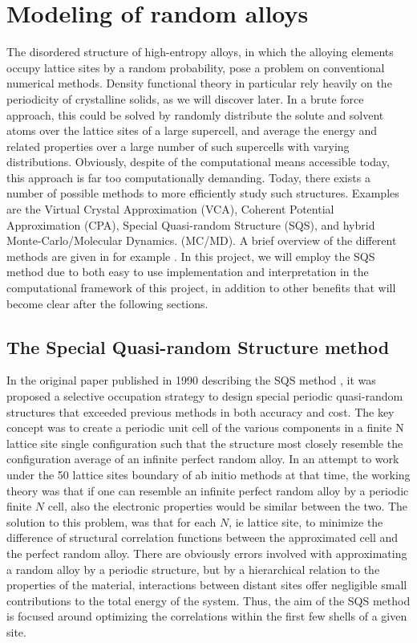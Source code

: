 \chapter{Modeling of random alloys}
\label{sec:SQS}

The disordered structure of high-entropy alloys, in which the alloying elements occupy lattice sites by a random probability, pose a problem on conventional numerical methods. Density functional theory in particular rely heavily on the periodicity of crystalline solids, as we will discover later. In a brute force approach, this could be solved by randomly distribute the solute and solvent atoms over the lattice sites of a large supercell, and average the energy and related properties over a large number of such supercells with varying distributions. Obviously, despite of the computational means accessible today, this approach is far too computationally demanding. Today, there exists a number of possible methods to more efficiently study such structures. Examples are the Virtual Crystal Approximation (VCA), Coherent Potential Approximation (CPA), Special Quasi-random Structure (SQS), and hybrid Monte-Carlo/Molecular Dynamics. (MC/MD). A brief overview of the different methods are given in for example \cite{sqsIntro}. In this project, we will employ the SQS method due to both easy to use implementation and interpretation in the computational framework of this project, in addition to other benefits that will become clear after the following sections.             

\section{The Special Quasi-random Structure method}
In the original paper published in 1990 describing the SQS method \cite{sqsfull}, it was proposed a selective occupation strategy to design special periodic quasi-random structures that exceeded previous methods in both accuracy and cost. The key concept was to create a periodic unit cell of the various components in a finite N lattice site single configuration such that the structure most closely resemble the configuration average of an infinite perfect random alloy. In an attempt to work under the 50 lattice sites boundary of ab initio methods at that time, the working theory was that if one can resemble an infinite perfect random alloy by a periodic finite $N$ cell, also the electronic properties would be similar between the two. The solution to this problem, was that for each $N$, ie lattice site, to minimize the difference of structural correlation functions between the approximated cell and the perfect random alloy. There are obviously errors involved with approximating a random alloy by a periodic structure, but by a hierarchical relation to the properties of the material, interactions between distant sites offer negligible small contributions to the total energy of the system. Thus, the aim of the SQS method is focused around optimizing the correlations within the first few shells of a given site. 

